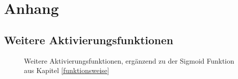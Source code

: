 \appendix
\label{Anhang}
\section{Anhang}

\subsection{Weitere Aktivierungsfunktionen}\label{anhang:weitereaktivierungsfunktionen}

\begin{figure}[h]
    \center
    
    \caption[Aktivierungsfunktionen]{Weitere Aktivierungsfunktionen, ergänzend zu der Sigmoid Funktion aus Kapitel \ref{funktionsweise}}
    \label{Aktivierungsfunktionen}%
\end{figure}

